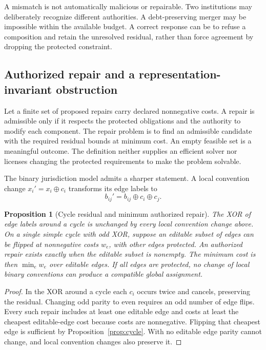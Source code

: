 \documentclass[11pt,letterpaper]{article}
\theoremstyle{plain}
\newtheorem{proposition}{Proposition}[section]
\theoremstyle{definition}
\theoremstyle{remark}
\begin{document}
A mismatch is not automatically malicious or repairable. Two institutions may deliberately recognize different authorities. A debt-preserving merger may be impossible within the available budget. A correct response can be to refuse a composition and retain the unresolved residual, rather than force agreement by dropping the protected constraint.

\subsection{Authorized repair and a representation-invariant obstruction}
Let a finite set of proposed repairs carry declared nonnegative costs. A repair is admissible only if it respects the protected obligations and the authority to modify each component. The repair problem is to find an admissible candidate with the required residual bounds at minimum cost. An empty feasible set is a meaningful outcome. The definition neither supplies an efficient solver nor licenses changing the protected requirements to make the problem solvable.

The binary jurisdiction model admits a sharper statement. A local convention change $x_i'=x_i\oplus c_i$ transforms its edge labels to
\[
b_{ij}'=b_{ij}\oplus c_i\oplus c_j.
\]

\begin{proposition}[Cycle residual and minimum authorized repair]\label{prop:cyclerepair}
The XOR of edge labels around a cycle is unchanged by every local convention change above. On a single simple cycle with odd XOR, suppose an editable subset of edges can be flipped at nonnegative costs $w_e$, with other edges protected. An authorized repair exists exactly when the editable subset is nonempty. The minimum cost is then $\min_e w_e$ over editable edges. If all edges are protected, no change of local binary conventions can produce a compatible global assignment.
\end{proposition}
\begin{proof}
In the XOR around a cycle each $c_i$ occurs twice and cancels, preserving the residual. Changing odd parity to even requires an odd number of edge flips. Every such repair includes at least one editable edge and costs at least the cheapest editable-edge cost because costs are nonnegative. Flipping that cheapest edge is sufficient by Proposition~\ref{prop:cycle}. With no editable edge parity cannot change, and local convention changes also preserve it.
\end{proof}
\end{document}
